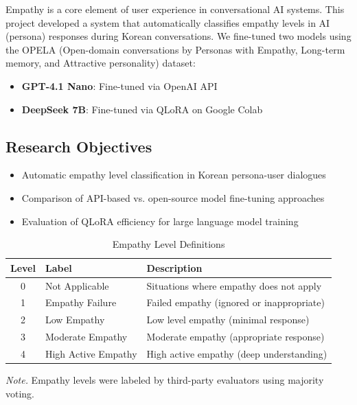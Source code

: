 \documentclass[11pt, a4paper]{article}
\begin{document}
Empathy is a core element of user experience in conversational AI systems. This project developed a system that automatically classifies empathy levels in AI (persona) responses during Korean conversations. We fine-tuned two models using the OPELA (Open-domain conversations by Personas with Empathy, Long-term memory, and Attractive personality) dataset:

\begin{itemize}
    \item \textbf{GPT-4.1 Nano}: Fine-tuned via OpenAI API
    \item \textbf{DeepSeek 7B}: Fine-tuned via QLoRA on Google Colab
\end{itemize}

\subsection{Research Objectives}

\begin{itemize}
    \item Automatic empathy level classification in Korean persona-user dialogues
    \item Comparison of API-based vs. open-source model fine-tuning approaches
    \item Evaluation of QLoRA efficiency for large language model training
\end{itemize}

\begin{table}[H]
\centering
\caption{Empathy Level Definitions}
\label{tab:empathy_levels}
\begin{tabular}{clp{8cm}}
\toprule
\textbf{Level} & \textbf{Label} & \textbf{Description} \\
\midrule
0 & Not Applicable & Situations where empathy does not apply \\
1 & Empathy Failure & Failed empathy (ignored or inappropriate) \\
2 & Low Empathy & Low level empathy (minimal response) \\
3 & Moderate Empathy & Moderate empathy (appropriate response) \\
4 & High Active Empathy & High active empathy (deep understanding) \\
\bottomrule
\end{tabular}

\vspace{0.5em}
\footnotesize\textit{Note.} Empathy levels were labeled by third-party evaluators using majority voting.
\end{table}
\end{document}

